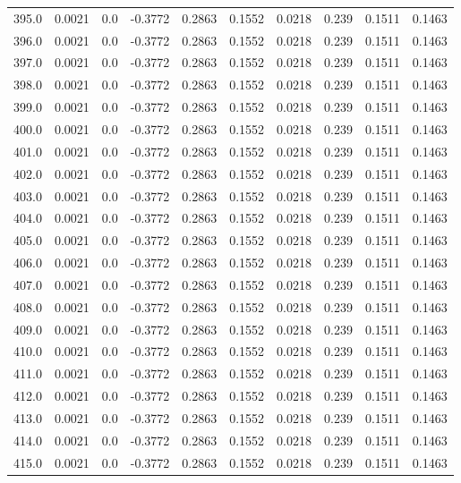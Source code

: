 \begin{longtable}{lrrrrrrrrr}
395.0 & 0.0021 & 0.0 & -0.3772 & 0.2863 & 0.1552 & 0.0218 & 0.239 & 0.1511 & 0.1463 \\
396.0 & 0.0021 & 0.0 & -0.3772 & 0.2863 & 0.1552 & 0.0218 & 0.239 & 0.1511 & 0.1463 \\
397.0 & 0.0021 & 0.0 & -0.3772 & 0.2863 & 0.1552 & 0.0218 & 0.239 & 0.1511 & 0.1463 \\
398.0 & 0.0021 & 0.0 & -0.3772 & 0.2863 & 0.1552 & 0.0218 & 0.239 & 0.1511 & 0.1463 \\
399.0 & 0.0021 & 0.0 & -0.3772 & 0.2863 & 0.1552 & 0.0218 & 0.239 & 0.1511 & 0.1463 \\
400.0 & 0.0021 & 0.0 & -0.3772 & 0.2863 & 0.1552 & 0.0218 & 0.239 & 0.1511 & 0.1463 \\
401.0 & 0.0021 & 0.0 & -0.3772 & 0.2863 & 0.1552 & 0.0218 & 0.239 & 0.1511 & 0.1463 \\
402.0 & 0.0021 & 0.0 & -0.3772 & 0.2863 & 0.1552 & 0.0218 & 0.239 & 0.1511 & 0.1463 \\
403.0 & 0.0021 & 0.0 & -0.3772 & 0.2863 & 0.1552 & 0.0218 & 0.239 & 0.1511 & 0.1463 \\
404.0 & 0.0021 & 0.0 & -0.3772 & 0.2863 & 0.1552 & 0.0218 & 0.239 & 0.1511 & 0.1463 \\
405.0 & 0.0021 & 0.0 & -0.3772 & 0.2863 & 0.1552 & 0.0218 & 0.239 & 0.1511 & 0.1463 \\
406.0 & 0.0021 & 0.0 & -0.3772 & 0.2863 & 0.1552 & 0.0218 & 0.239 & 0.1511 & 0.1463 \\
407.0 & 0.0021 & 0.0 & -0.3772 & 0.2863 & 0.1552 & 0.0218 & 0.239 & 0.1511 & 0.1463 \\
408.0 & 0.0021 & 0.0 & -0.3772 & 0.2863 & 0.1552 & 0.0218 & 0.239 & 0.1511 & 0.1463 \\
409.0 & 0.0021 & 0.0 & -0.3772 & 0.2863 & 0.1552 & 0.0218 & 0.239 & 0.1511 & 0.1463 \\
410.0 & 0.0021 & 0.0 & -0.3772 & 0.2863 & 0.1552 & 0.0218 & 0.239 & 0.1511 & 0.1463 \\
411.0 & 0.0021 & 0.0 & -0.3772 & 0.2863 & 0.1552 & 0.0218 & 0.239 & 0.1511 & 0.1463 \\
412.0 & 0.0021 & 0.0 & -0.3772 & 0.2863 & 0.1552 & 0.0218 & 0.239 & 0.1511 & 0.1463 \\
413.0 & 0.0021 & 0.0 & -0.3772 & 0.2863 & 0.1552 & 0.0218 & 0.239 & 0.1511 & 0.1463 \\
414.0 & 0.0021 & 0.0 & -0.3772 & 0.2863 & 0.1552 & 0.0218 & 0.239 & 0.1511 & 0.1463 \\
415.0 & 0.0021 & 0.0 & -0.3772 & 0.2863 & 0.1552 & 0.0218 & 0.239 & 0.1511 & 0.1463 \\

\end{longtable}
